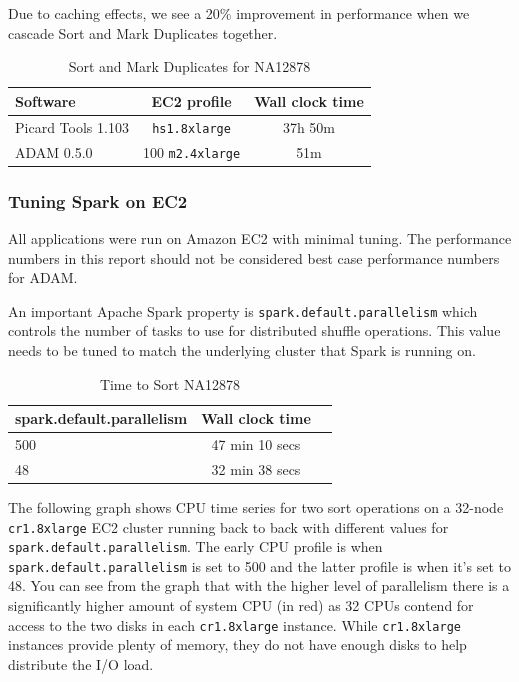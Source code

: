 \documentclass[10pt,twocolumn]{article}
\theoremstyle{plain}
\begin{document}
Due to caching effects, we see a 20\% improvement in performance when we cascade Sort and Mark Duplicates together.

\begin{table}[h]
\caption{Sort and Mark Duplicates for NA12878}
\label{tab:time-mark-duplicates-sort}
\begin{scriptsize}
\begin{center}
\begin{tabular}{| l | c | c |}
\hline
\bf Software & \bf EC2 profile & \bf Wall clock time \\
\hline
Picard Tools 1.103 & \texttt{hs1.8xlarge} & 37h 50m \\
ADAM 0.5.0 & 100 \texttt{m2.4xlarge} & 51m \\
\hline
\end{tabular}
\end{center}
\end{scriptsize}
\end{table}

\subsubsection{Tuning Spark on EC2}

All applications were run on Amazon EC2 with minimal tuning. The performance numbers in this report
should not be considered best case performance numbers for ADAM.

An important Apache Spark property is \texttt{spark.default.parallelism} which controls the number
of tasks to use for distributed shuffle operations. This value needs to be tuned to match the
underlying cluster that Spark is running on.

\begin{table}[h]
\caption{Time to Sort NA12878}
\label{tab:time-sort-parallelism}
\begin{center}
\begin{tabular}{| l | c | c |}
\hline
\bf \small{spark.default.parallelism} & \bf Wall clock time \\
\hline
500 & 47 min 10 secs \\
48 & 32 min 38 secs \\ 
\hline
\end{tabular}
\end{center}
\end{table}

The following graph shows CPU time series for two sort operations on a 32-node \texttt{cr1.8xlarge}
EC2 cluster running back to back with different values for \texttt{spark.default.parallelism}.
The early CPU profile is when \texttt{spark.default.parallelism} is set to 500 and the latter profile
is when it's set to 48. You can see from the graph that with the higher level of parallelism
there is a significantly higher amount of system CPU (in red) as 32 CPUs contend for access to 
the two disks in each \texttt{cr1.8xlarge} instance. While \texttt{cr1.8xlarge} instances provide
plenty of memory, they do not have enough disks to help distribute the I/O load.
\end{document}

